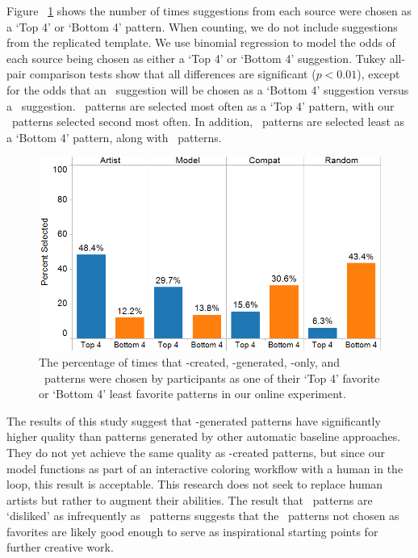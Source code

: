 Figure ~\ref{fig:study} shows the number of times suggestions from each source were chosen as a `Top 4' or `Bottom 4' pattern. When counting, we do not include suggestions from the replicated template. We use binomial regression to model the odds of each source being chosen as either a `Top 4' or `Bottom 4' suggestion. Tukey all-pair comparison tests show that all differences are significant ($p < 0.01$), except for the odds that an \artistSource~suggestion will be chosen as a `Bottom 4' suggestion versus a \modelSource~suggestion. \artistSource~patterns are selected most often as a `Top 4' pattern, with our \modelSource~patterns selected second most often. In addition, \modelSource~patterns are selected least as a `Bottom 4' pattern, along with \artistSource~patterns.

\begin{figure}[h!]
  \begin{center}
  \includegraphics[width=\columnwidth]{figs/evaluation.png}
	\end{center}
\caption{The percentage of times that \artistSource-created, \modelSource-generated, \compatSource-only, and \randomSource~patterns were chosen by participants as one of their `Top 4' favorite or `Bottom 4' least favorite patterns in our online experiment.}

 \label{fig:study}
\end{figure}

The results of this study suggest that \modelSource-generated patterns have significantly higher quality than patterns generated by other automatic baseline approaches. They do not yet achieve the same quality as \artistSource-created patterns, but since our model functions as part of an interactive coloring workflow with a human in the loop, this result is acceptable. This research does not seek to replace human artists but rather to augment their abilities. The result that \modelSource~patterns are `disliked' as infrequently as \artistSource~patterns suggests that the \modelSource~patterns not chosen as favorites are likely good enough to serve as inspirational starting points for further creative work.